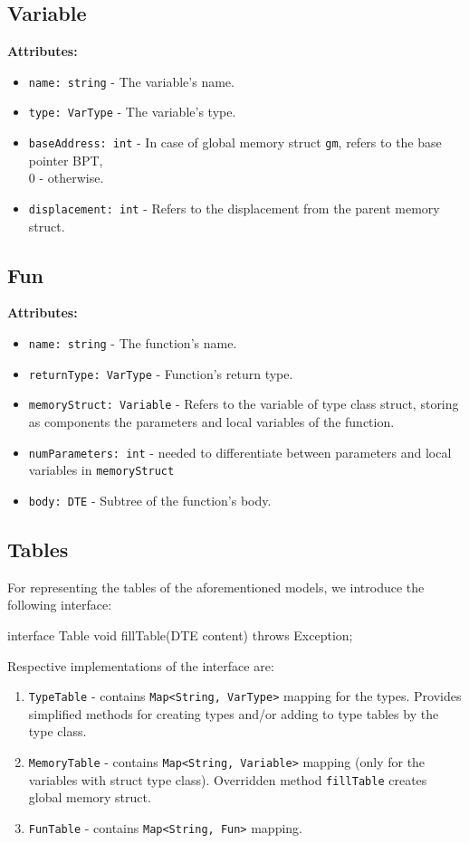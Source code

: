 \subsection{Variable}\label{subsec:variable}
\textbf{Attributes:}
\begin{itemize}
    \item \verb+name: string+ - The variable's name.
    \item \verb+type: VarType+ - The variable's type.
    \item \verb+baseAddress: int+ - In case of global memory struct \verb+gm+, refers to the base pointer BPT,\\ 0 - otherwise.
    \item \verb+displacement: int+ - Refers to the displacement from the parent memory struct.
\end{itemize}

\subsection{Fun}\label{subsec:fun}
\textbf{Attributes:}
\begin{itemize}
    \item \verb+name: string+ - The function's name.
    \item \verb+returnType: VarType+ - Function's return type.
    \item \verb+memoryStruct: Variable+ - Refers to the variable of type class struct, storing as components the parameters
    and local variables of the function.
    \item \verb+numParameters: int+ - needed to differentiate between parameters and local variables in \verb+memoryStruct+
    \item \verb+body: DTE+ - Subtree of the function's body.
\end{itemize}

\subsection{Tables}\label{subsec:tables}
For representing the tables of the aforementioned models, we introduce the following interface:
\begin{codeblock}[Table]
    interface Table {
        void fillTable(DTE content) throws Exception;
    }
\end{codeblock}
Respective implementations of the interface are:
\begin{enumerate}
    \item \verb+TypeTable+ - contains \verb+Map<String, VarType>+ mapping for the types.
    Provides simplified methods for creating types and/or adding to type tables by the type class.
    \item \verb+MemoryTable+ - contains \verb+Map<String, Variable>+ mapping (only for the variables with struct type class).
    Overridden method \verb+fillTable+ creates global memory struct.
    \item \verb+FunTable+ - contains \verb+Map<String, Fun>+ mapping.
\end{enumerate}



